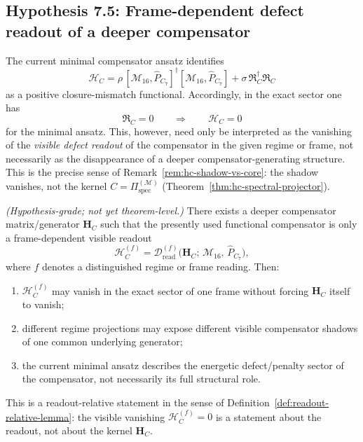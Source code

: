 
\subsection{Hypothesis 7.5: Frame-dependent defect readout of a deeper compensator}
\label{subsec:hc-frame-dependent-readout}

The current minimal compensator ansatz identifies
\[
  \mathcal{H}_C
  =
  \rho\,[\mathcal{M}_{16},\hat P_{C_7}]^\dagger
        [\mathcal{M}_{16},\hat P_{C_7}]
  +
  \sigma\,\mathfrak{R}_C^\dagger\mathfrak{R}_C
\]
as a positive closure-mismatch functional. Accordingly, in the exact
sector one has
\[
  \mathfrak{R}_C = 0
  \qquad\Longrightarrow\qquad
  \mathcal{H}_C = 0
\]
for the minimal ansatz. This, however, need only be interpreted as the
vanishing of the \emph{visible defect readout} of the compensator in the
given regime or frame, not necessarily as the disappearance of a deeper
compensator-generating structure. This is the precise sense of
Remark~\ref{rem:hc-shadow-vs-core}: the shadow vanishes, not the kernel
$C = \Pi^{(\mathcal{M})}_{\mathrm{spec}}$
(Theorem~\ref{thm:hc-spectral-projector}).

\begin{proposition}
\label{hyp:frame-dependent-defect-readout}
\emph{(Hypothesis-grade; not yet theorem-level.)}
There exists a deeper compensator matrix/generator $\mathbf{H}_C$ such
that the presently used functional compensator is only a frame-dependent
visible readout
\[
  \mathcal{H}_C^{(f)}
  =
  \mathcal{D}_{\mathrm{read}}^{(f)}
  \bigl(\mathbf{H}_C;\,\mathcal{M}_{16},\,\hat P_{C_7}\bigr),
\]
where $f$ denotes a distinguished regime or frame reading. Then:
\begin{enumerate}[label=(\roman*)]
  \item $\mathcal{H}_C^{(f)}$ may vanish in the exact sector of one
        frame without forcing $\mathbf{H}_C$ itself to vanish;
  \item different regime projections may expose different visible
        compensator shadows of one common underlying generator;
  \item the current minimal ansatz describes the energetic defect/penalty
        sector of the compensator, not necessarily its full structural role.
\end{enumerate}
This is a readout-relative statement in the sense of
Definition~\ref{def:readout-relative-lemma}: the visible vanishing
$\mathcal{H}_C^{(f)} = 0$ is a statement about the readout, not about
the kernel $\mathbf{H}_C$.
\end{proposition}

